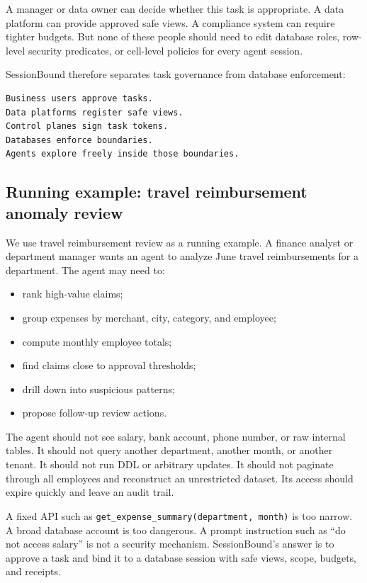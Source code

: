 \documentclass[
]{article}
\providecommand{\tightlist}{%
  \setlength{\itemsep}{0pt}\setlength{\parskip}{0pt}}
\begin{document}
A manager or data owner can decide whether this task is appropriate. A
data platform can provide approved safe views. A compliance system can
require tighter budgets. But none of these people should need to edit
database roles, row-level security predicates, or cell-level policies
for every agent session.

SessionBound therefore separates task governance from database
enforcement:

\begin{verbatim}
Business users approve tasks.
Data platforms register safe views.
Control planes sign task tokens.
Databases enforce boundaries.
Agents explore freely inside those boundaries.
\end{verbatim}

\hypertarget{running-example-travel-reimbursement-anomaly-review}{%
\subsection{Running example: travel reimbursement anomaly
review}\label{running-example-travel-reimbursement-anomaly-review}}

We use travel reimbursement review as a running example. A finance
analyst or department manager wants an agent to analyze June travel
reimbursements for a department. The agent may need to:

\begin{itemize}
\tightlist
\item
  rank high-value claims;
\item
  group expenses by merchant, city, category, and employee;
\item
  compute monthly employee totals;
\item
  find claims close to approval thresholds;
\item
  drill down into suspicious patterns;
\item
  propose follow-up review actions.
\end{itemize}

The agent should not see salary, bank account, phone number, or raw
internal tables. It should not query another department, another month,
or another tenant. It should not run DDL or arbitrary updates. It should
not paginate through all employees and reconstruct an unrestricted
dataset. Its access should expire quickly and leave an audit trail.

A fixed API such as \texttt{get\_expense\_summary(department,\ month)}
is too narrow. A broad database account is too dangerous. A prompt
instruction such as ``do not access salary'' is not a security
mechanism. SessionBound's answer is to approve a task and bind it to a
database session with safe views, scope, budgets, and receipts.
\end{document}
